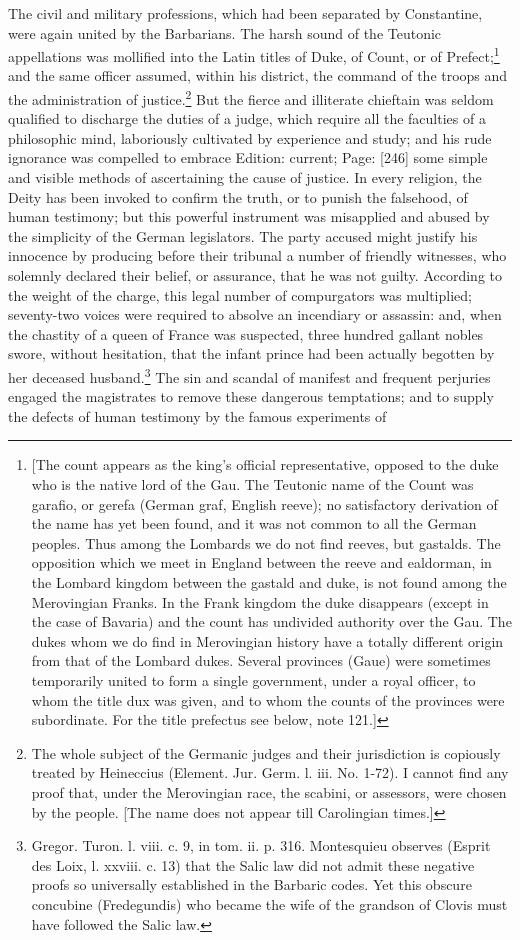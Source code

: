 The civil and military professions, which had been separated by Constantine, were again united by the Barbarians. The harsh sound of the Teutonic appellations was mollified into the Latin titles of Duke, of Count, or of Prefect;\footnote{[The count appears as the king\texthebrew{}’s official representative, opposed to the duke who is the native lord of the Gau. The Teutonic name of the Count was garafio, or gerefa (German graf, English reeve); no satisfactory derivation of the name has yet been found, and it was not common to all the German peoples. Thus among the Lombards we do not find reeves, but gastalds. The opposition which we meet in England between the reeve and ealdorman, in the Lombard kingdom between the gastald and duke, is not found among the Merovingian Franks. In the Frank kingdom the duke disappears (except in the case of Bavaria) and the count has undivided authority over the Gau. The dukes whom we do find in Merovingian history have a totally different origin from that of the Lombard dukes. Several provinces (Gaue) were sometimes temporarily united to form a single government, under a royal officer, to whom the title dux was given, and to whom the counts of the provinces were subordinate. For the title prefectus see below, note 121.]} and the same officer assumed, within his district, the command of the troops and the administration of justice.\footnote{The whole subject of the Germanic judges and their jurisdiction is copiously treated by Heineccius (Element. Jur. Germ. l. iii. No. 1-72). I cannot find any proof that, under the Merovingian race, the scabini, or assessors, were chosen by the people. [The name does not appear till Carolingian times.]} But the fierce and illiterate chieftain was seldom qualified to discharge the duties of a judge, which require all the faculties of a philosophic mind, laboriously cultivated by experience and study; and his rude ignorance was compelled to embrace Edition: current; Page: [246] some simple and visible methods of ascertaining the cause of justice. In every religion, the Deity has been invoked to confirm the truth, or to punish the falsehood, of human testimony; but this powerful instrument was misapplied and abused by the simplicity of the German legislators. The party accused might justify his innocence by producing before their tribunal a number of friendly witnesses, who solemnly declared their belief, or assurance, that he was not guilty. According to the weight of the charge, this legal number of compurgators was multiplied; seventy-two voices were required to absolve an incendiary or assassin: and, when the chastity of a queen of France was suspected, three hundred gallant nobles swore, without hesitation, that the infant prince had been actually begotten by her deceased husband.\footnote{Gregor. Turon. l. viii. c. 9, in tom. ii. p. 316. Montesquieu observes (Esprit des Loix, l. xxviii. c. 13) that the Salic law did not admit these negative proofs so universally established in the Barbaric codes. Yet this obscure concubine (Fredegundis) who became the wife of the grandson of Clovis must have followed the Salic law.} The sin and scandal of manifest and frequent perjuries engaged the magistrates to remove these dangerous temptations; and to supply the defects of human testimony by the famous experiments of 